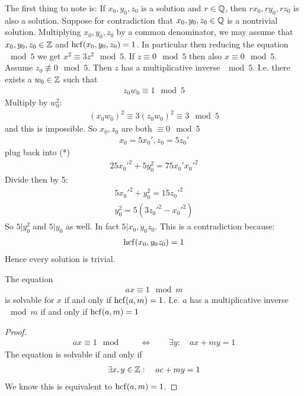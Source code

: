 \begin{ex}
\begin{itemize}
		The first thing to note is: If $x_0, y_0, z_0$ is a solution and $r\in \mathbb Q$, then $r x_0, ry_0, rz_0$ is also a solution.
		Suppose for contradiction that $x_0, y_0, z_0 \in \mathbb Q$ is a nontrivial solution. 
		Multiplying $x_0, y_0, z_0$ by a common denominator, we may assume that $x_0, y_0, z_0 \in \mathbb Z$ and $\operatorname{hcf}(x_0, y_0, z_0) = 1$. In particular then reducing the equation $\mod 5$ we get $x^2 \equiv 3z^2 \mod 5$. If $z \equiv 0 \mod 5$ then also $x \equiv 0 \mod 5$.
		Assume $z_0 \not\equiv 0 \mod 5$. Then $z$ has a multiplicative  inverse $\mod 5$. I.e. there exists a $w_0 \in \mathbb Z$ such that 
		\begin{align*}
		z_0 w_0 \equiv 1 \mod 5
		\end{align*}
		Multiply by $w_0^2$:
		\begin{align*}
		(x_0w_0)^2 \equiv 3(z_0 w_0)^2 \equiv 3 \mod 5
		\end{align*}
		and this is impossible.
		So $x_0, z_0$ are both $\equiv 0 \mod 5 $
		\begin{align*}
		x_0 = 5 x_0', z_0 = 5 z_0'
		\end{align*}
		plug back into (*)
		\begin{align*}
		25 x_0'^2 + 5y_0^2 = 75 x_0'x_0'^2
		\end{align*} 
		Divide then by 5:
		\begin{align*}
		5 x_0'^2 + y_0^2 = 15 z_0'^2 \\
		y_0^2 = 5 (3z_0'^2 - x_0'^2)
		\end{align*}
		So $5|y_0^2$ and  $5 |y_0$ as well. In fact $5|x_0,y_0z_0$. This is a contradiction because:
		\begin{align*}
		\operatorname{hcf}(x_0,y_0z_0) = 1
		\end{align*}
		Hence every solution is trivial.
	\end{itemize}
\end{ex}

\begin{pp}
The equation
\begin{align*}
ax \equiv 1 \mod m
\end{align*}
is solvable for $x$ if and only if $\operatorname{hcf}(a,m) = 1$. I.e. $a$ has a multiplicative inverse $\mod m$ if and only if $\operatorname{hcf}(a,m)=1$
\end{pp}

\begin{proof}
	\begin{align*}
	ax \equiv 1 \mod \qquad \Leftrightarrow \qquad \exists y: \quad ax+ my = 1
	\end{align*}
	The equation is solvable if and only if
	\begin{align*}
	\exists x,y \in \mathbb Z: \quad ac + my = 1
	\end{align*}
	We know this is equivalent to $\operatorname{hcf}(a,m)=1$.
\end{proof}

